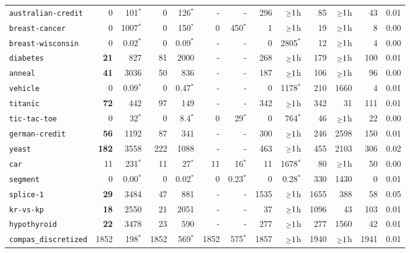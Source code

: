 \begin{tabular}{lrrrrrrrrrrrr}
\texttt{australian-credit} & 0 & 101$^*$ & 0 & 126$^*$ & - & - & 296 & $\mathsmaller{\geq}1$h & 85 & $\mathsmaller{\geq}1$h & 43 & 0.01\\
\texttt{breast-cancer} & 0 & 1007$^*$ & 0 & 150$^*$ & 0 & 450$^*$ & 1 & $\mathsmaller{\geq}1$h & 19 & $\mathsmaller{\geq}1$h & 8 & 0.00\\
\texttt{breast-wisconsin} & 0 & 0.02$^*$ & 0 & 0.09$^*$ & - & - & 0 & 2805$^*$ & 12 & $\mathsmaller{\geq}1$h & 4 & 0.00\\
\texttt{diabetes} & \textbf{21} & 827 & 81 & 2000 & - & - & 268 & $\mathsmaller{\geq}1$h & 179 & $\mathsmaller{\geq}1$h & 100 & 0.01\\
\texttt{anneal} & \textbf{41} & 3036 & 50 & 836 & - & - & 187 & $\mathsmaller{\geq}1$h & 106 & $\mathsmaller{\geq}1$h & 96 & 0.00\\
\texttt{vehicle} & 0 & 0.09$^*$ & 0 & 0.47$^*$ & - & - & 0 & 1178$^*$ & 210 & 1660 & 4 & 0.01\\
\texttt{titanic} & \textbf{72} & 442 & 97 & 149 & - & - & 342 & $\mathsmaller{\geq}1$h & 342 & 31 & 111 & 0.01\\
\texttt{tic-tac-toe} & 0 & 32$^*$ & 0 & 8.4$^*$ & 0 & 29$^*$ & 0 & 764$^*$ & 46 & $\mathsmaller{\geq}1$h & 22 & 0.00\\
\texttt{german-credit} & \textbf{56} & 1192 & 87 & 341 & - & - & 300 & $\mathsmaller{\geq}1$h & 246 & 2598 & 150 & 0.01\\
\texttt{yeast} & \textbf{182} & 3558 & 222 & 1088 & - & - & 463 & $\mathsmaller{\geq}1$h & 455 & 2103 & 306 & 0.02\\
\texttt{car} & 11 & 231$^*$ & 11 & 27$^*$ & 11 & 16$^*$ & 11 & 1678$^*$ & 80 & $\mathsmaller{\geq}1$h & 50 & 0.00\\
\texttt{segment} & 0 & 0.00$^*$ & 0 & 0.02$^*$ & 0 & 0.23$^*$ & 0 & 0.28$^*$ & 330 & 1430 & 0 & 0.01\\
\texttt{splice-1} & \textbf{29} & 3484 & 47 & 881 & - & - & 1535 & $\mathsmaller{\geq}1$h & 1655 & 388 & 58 & 0.05\\
\texttt{kr-vs-kp} & \textbf{18} & 2550 & 21 & 2051 & - & - & 37 & $\mathsmaller{\geq}1$h & 1096 & 43 & 103 & 0.01\\
\texttt{hypothyroid} & \textbf{22} & 3478 & 23 & 590 & - & - & 277 & $\mathsmaller{\geq}1$h & 277 & 1560 & 42 & 0.01\\
\texttt{compas\_discretized} & 1852 & 198$^*$ & 1852 & 569$^*$ & 1852 & 575$^*$ & 1857 & $\mathsmaller{\geq}1$h & 1940 & $\mathsmaller{\geq}1$h & 1941 & 0.01\\

\end{tabular}
